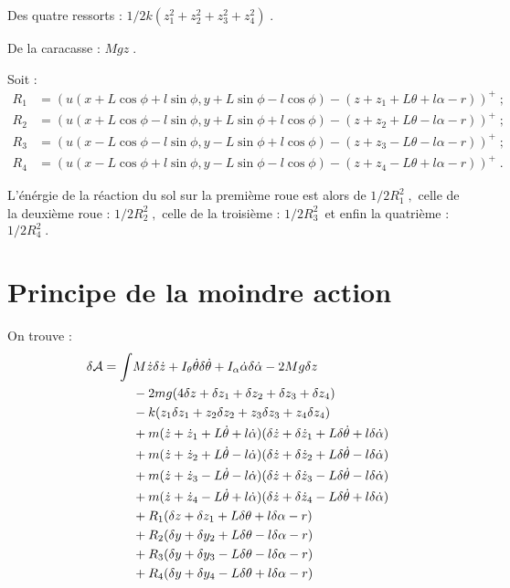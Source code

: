 \documentclass[a4paper,11pt]{amsart}
\begin{document}
Des quatre ressorts :
$ 1/2k(z^2_1+z^2_2+z^2_3+z^2_4)\;.$

De la caracasse :
$ Mgz\;.$

Soit :
\begin{align*} 
R_1 &= (u(x+L\cos\phi+l\sin\phi,y+L\sin\phi-l\cos\phi)-(z+z_1+L\theta+l\alpha-r))^+\;;\\
R_2 &= (u(x+L\cos\phi-l\sin\phi,y+L\sin\phi+l\cos\phi)-(z+z_2+L\theta-l\alpha-r))^+\;;\\
R_3 &= (u(x-L\cos\phi-l\sin\phi,y-L\sin\phi+l\cos\phi)-(z+z_3-L\theta-l\alpha-r))^+\;;\\
R_4 &= (u(x-L\cos\phi+l\sin\phi,y-L\sin\phi-l\cos\phi)-(z+z_4-L\theta+l\alpha-r))^+\;.
\end{align*}
 
L'\'en\'ergie de la r\'eaction du sol sur la premi\`eme roue est alors
de $1/2R_1^2\;,$ celle de la deuxi\`eme roue : $1/2R_2^2\;,$ celle de
la troisi\`eme : $1/2R_3^2\,$ et enfin la quatri\`eme : $1/2R_4^2\;.$

\section{Principe de la moindre action}

On trouve :
\begin{align*}
\delta{\mathcal A} = \int &
                      M\dot{z}\delta \dot{z} 
                      + I_{\theta}\dot{\theta}\delta\dot{\theta} +
                        I_{\alpha}\dot{\alpha}\delta\dot{\alpha} -2Mg\delta z \\
                  &   -2mg(4\delta z + \delta z_{1} + \delta z_{2} 
                          +\delta z_{3} + \delta z_{4}) \\
                  &   -k(z_{1}\delta z_{1} + z_{2}\delta z_{2}
                      +z_{3}\delta z_{3} + z_{4}\delta z_{4}) \\
                  &   +m(\dot{z}+\dot{z}_1+L\dot{\theta}+l\dot{\alpha})
                      (\delta\dot{z}+\delta\dot{z}_1+L\delta\dot{\theta}+l\delta\dot{\alpha}) 
                      \\ 
                  &   +m(\dot{z}+\dot{z}_2+L\dot{\theta}-l\dot{\alpha})
                      (\delta\dot{z}+\delta\dot{z}_2+L\delta\dot{\theta}-l\delta\dot{\alpha})
                      \\
                  &   +m(\dot{z}+\dot{z}_3-L\dot{\theta}-l\dot{\alpha})
                      (\delta\dot{z}+\delta\dot{z}_3-L\delta\dot{\theta}-l\delta\dot{\alpha})
                      \\
                  &   +m(\dot{z}+\dot{z}_4-L\dot{\theta}+l\dot{\alpha})
                      (\delta\dot{z}+\delta\dot{z}_4-L\delta\dot{\theta}+l\delta\dot{\alpha})\\
                  &   +R_1(\delta z+\delta z_1+L\delta\theta+l\delta\alpha-r)\\
                  &   +R_2(\delta y+\delta y_2+L\delta\theta-l\delta\alpha-r)\\
                  &   +R_3(\delta y+\delta y_3-L\delta\theta-l\delta\alpha-r)\\
                  &   +R_4(\delta y+\delta y_4-L\delta\theta+l\delta\alpha-r) 
\end{align*}
\end{document}

